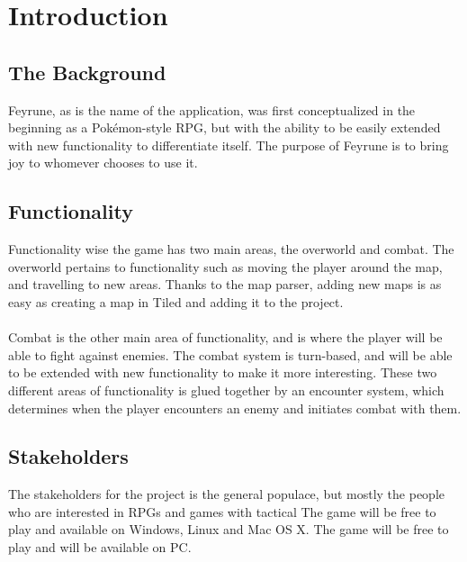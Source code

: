 \section{Introduction}

\begin{comment}
Give some background and explain the purpose of this application. Describe
the functionality of the application. Describe the stakeholders of the project,
highlight who will benefit from/use this particular application.
\end{comment}
\subsection{The Background}
Feyrune, as is the name of the application, was first conceptualized in the beginning as a Pokémon-style RPG, but with the ability to be easily extended with new functionality to differentiate itself. The purpose of Feyrune is to bring joy to whomever chooses to use it.

\subsection{Functionality}
Functionality wise the game has two main areas, the overworld and combat. The overworld pertains to functionality such as moving the player around the map, and travelling to new areas. Thanks to the map parser, adding new maps is as easy as creating a map in Tiled\cite{tiled} and adding it to the project.\\
\\
Combat is the other main area of functionality, and is where the player will be able to fight against enemies. The combat system is turn-based, and will be able to be extended with new functionality to make it more interesting. These two different areas of functionality is glued together by an encounter system, which determines when the player encounters an enemy and initiates combat with them.

\subsection{Stakeholders}
The stakeholders for the project is the general populace, but mostly the people who are interested in RPGs and games with tactical The game will be free to play and available on Windows, Linux and Mac OS X. The game will be free to play and will be available on PC.



